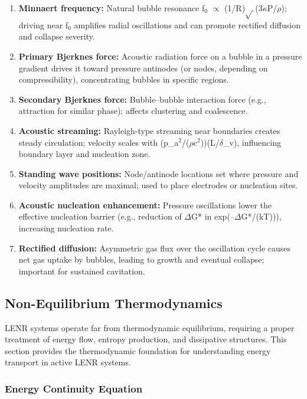 \documentclass[11pt,a4paper]{article}
\begin{document}
\begin{enumerate}
\def\labelenumi{\arabic{enumi}.}
\item
  \textbf{Minnaert frequency:} Natural bubble resonance f$_{0}$ $\propto$ (1/R)$\sqrt{\,}$(3$\kappa$P/$\rho$); driving near f$_{0}$ amplifies radial oscillations and can promote rectified diffusion and collapse severity.
\item
  \textbf{Primary Bjerknes force:} Acoustic radiation force on a bubble in a pressure gradient drives it toward pressure antinodes (or nodes, depending on compressibility), concentrating bubbles in specific regions.
\item
  \textbf{Secondary Bjerknes force:} Bubble--bubble interaction force (e.g., attraction for similar phase); affects clustering and coalescence.
\item
  \textbf{Acoustic streaming:} Rayleigh-type streaming near boundaries creates steady circulation; velocity scales with (p\_a$^{2}$/($\rho$c$^{2}$))(L/$\delta$\_v), influencing boundary layer and nucleation zone.
\item
  \textbf{Standing wave positions:} Node/antinode locations set where pressure and velocity amplitudes are maximal; used to place electrodes or nucleation sites.
\item
  \textbf{Acoustic nucleation enhancement:} Pressure oscillations lower the effective nucleation barrier (e.g., reduction of $\Delta$G* in exp(--$\Delta$G*/(kT))), increasing nucleation rate.
\item
  \textbf{Rectified diffusion:} Asymmetric gas flux over the oscillation cycle causes net gas uptake by bubbles, leading to growth and eventual collapse; important for sustained cavitation.
\end{enumerate}

\subsection{Non-Equilibrium Thermodynamics}

LENR systems operate far from thermodynamic equilibrium, requiring a proper treatment of energy flow, entropy production, and dissipative structures. This section provides the thermodynamic foundation for understanding energy transport in active LENR systems.

\subsubsection{Energy Continuity Equation}
\end{document}
